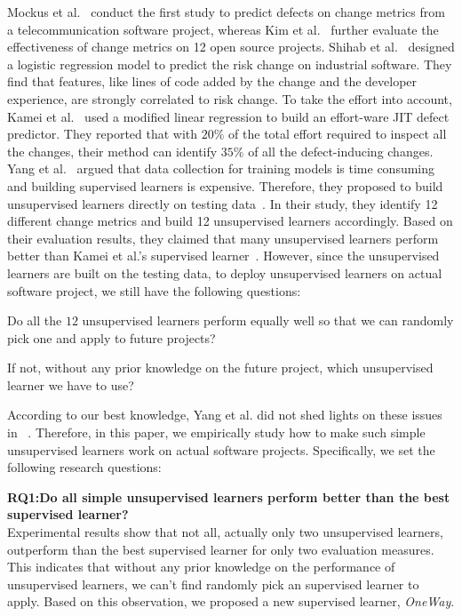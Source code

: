 Mockus et al.~\cite{mockus2000predicting} conduct the first study to predict defects on change metrics from a telecommunication software project, whereas Kim et al.~\cite{kim2008classifying} further evaluate the effectiveness of change metrics on 12 open source projects.
Shihab et al.~\cite{shihab2012industrial} designed a logistic regression model to predict the risk change on
industrial software. They find that  features, like lines of code added
by the change and the developer experience, are strongly correlated to risk change. To take the effort into account, Kamei et al.~\cite{kamei2013large}
used a modified linear regression to build an effort-ware JIT defect predictor.
They reported that with $20\%$ of the total effort required to inspect all the changes,
their method can identify $35\%$ of all the defect-inducing changes. Yang et al.~\cite{yang2016effort} argued
that data collection for training models is time consuming and 
building supervised learners is expensive. Therefore, they
proposed to build unsupervised learners directly on testing data~\cite{yang2016effort}.
In their study, they identify 12 different change metrics and build
12 unsupervised learners accordingly. Based on their evaluation results, they claimed that many unsupervised learners perform better than Kamei et al.'s supervised learner~\cite{yang2016effort}. However, since the unsupervised learners
are built on the testing data, to deploy unsupervised learners on actual software
project, we still have the following questions:
\bi 
\item Do all the $12$ unsupervised learners perform equally well so that we can randomly pick one and apply to future projects?
\item If not, without any prior knowledge on the future project,  which unsupervised learner we have to use?
\ei

According to our best knowledge, Yang et al. did not shed lights on these issues in ~\cite{yang2016effort}. Therefore, in this paper, we empirically study how to make such
simple unsupervised learners work on actual software projects. Specifically, we set the following research questions:

\bi 
\item \textbf{RQ1:Do all simple unsupervised learners perform better than the best supervised learner?}\\
Experimental results show that not all, actually only two unsupervised learners,  outperform than the best supervised learner for only two evaluation measures. This indicates that without any prior knowledge on the performance of unsupervised learners, we can't find randomly pick an supervised learner to apply. Based on this observation, we proposed a new supervised learner, {\it OneWay}.

